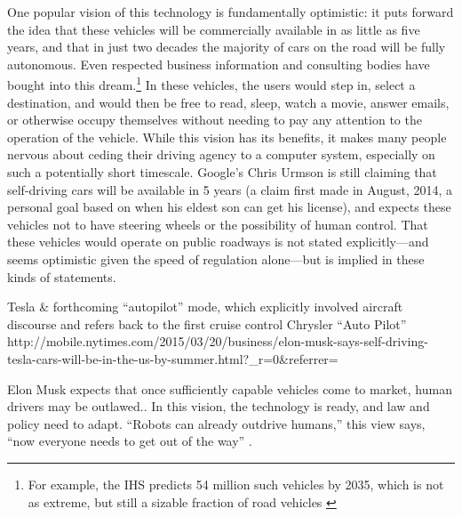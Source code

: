 One popular vision of this technology is fundamentally optimistic: it
puts forward the
idea that these vehicles will be commercially available in as little
as five years, and that in just two decades the majority of cars on the road will be
fully autonomous. Even respected business information and consulting
bodies have bought into this dream.\footnote{For example, the IHS
  predicts 54 million such vehicles by 2035, which is not as extreme,
  but still a sizable fraction of road vehicles \cite{IHSstudy}} In
these vehicles, the users would 
step in, select a destination, and would then be free to read, sleep,
watch a movie, answer emails, or otherwise occupy themselves without
needing to pay any attention to the operation of the vehicle. While this
vision has its benefits, it makes many people nervous about
ceding their driving agency to a computer system, especially on such a
potentially short timescale.\cite{clytton} Google's Chris Urmson is
still claiming that self-driving cars will be available in 5 years (a
claim first made in August, 2014, a personal goal based on when his
eldest son can get his license\cite{???-GomesHidden}), and expects
these vehicles not to have steering wheels or the possibility of human
control. That these vehicles would operate on public roadways is not
stated explicitly---and seems optimistic given the speed of regulation
alone---but is implied in these kinds of statements. 

Tesla & forthcoming ``autopilot'' mode, which explicitly involved aircraft
discourse and refers back to the first cruise control Chrysler ``Auto Pilot''
http://mobile.nytimes.com/2015/03/20/business/elon-musk-says-self-driving-tesla-cars-will-be-in-the-us-by-summer.html?_r=0&referrer=

Elon Musk expects
that once sufficiently capable vehicles 
come to market, human drivers may be
outlawed.\cite{???-http://www.forbes.com/sites/leoking/2015/03/19/googles-gargantuan-push-for-cars-with-no-steering-wheel-by-2020/}.
In this vision, the technology is ready, and law and policy need to
adapt. ``Robots can already outdrive humans,'' this view says, ``now
everyone needs to get out of the way''
\cite{???-http://www.popsci.com/cars/article/2013-09/google-self-driving-car}. 



